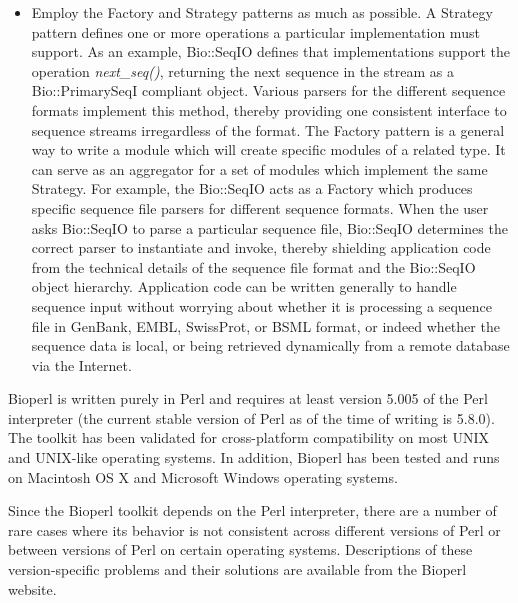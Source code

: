 \documentclass[12pt]{article}
\begin{document}
\begin{itemize}
\item Employ the Factory and Strategy patterns \cite{gangoffour} as
much as possible. A Strategy pattern defines one or more operations a
particular implementation must support.  As an example, Bio::SeqIO
defines that implementations support the operation
\textit{next\_seq()}, returning the next sequence in the stream as a
Bio::PrimarySeqI compliant object.  Various parsers for the different
sequence formats implement this method, thereby providing one
consistent interface to sequence streams irregardless of the format.
The Factory pattern is a general way to write a module which will
create specific modules of a related type.  It can serve as an
aggregator for a set of modules which implement the same Strategy.
For example, the Bio::SeqIO acts as a Factory which produces specific
sequence file parsers for different sequence formats.  When the user
asks Bio::SeqIO to parse a particular sequence file, Bio::SeqIO
determines the correct parser to instantiate and invoke, thereby
shielding application code from the technical details of the sequence
file format and the Bio::SeqIO object hierarchy. Application code can
be written generally to handle sequence input without worrying about
whether it is processing a sequence file in GenBank, EMBL, SwissProt,
or BSML format, or indeed whether the sequence data is local, or being
retrieved dynamically from a remote database via the Internet.
\end{itemize}


Bioperl is written purely in Perl and requires at least version 5.005
of the Perl interpreter (the current stable version of Perl as of the
time of writing is 5.8.0).  The toolkit has been validated for
cross-platform compatibility on most UNIX and UNIX-like operating
systems.  In addition, Bioperl has been tested and runs on Macintosh
OS X and Microsoft Windows operating systems.  

Since the Bioperl toolkit depends on the Perl interpreter, there are a
number of rare cases where its behavior is not consistent across
different versions of Perl or between versions of Perl on certain
operating systems.  Descriptions of these version-specific problems
and their solutions are available from the Bioperl website.
\end{document}
